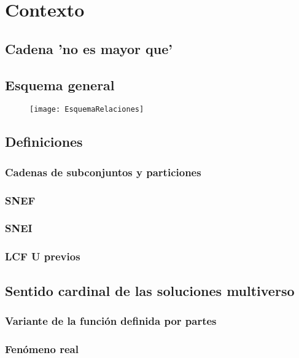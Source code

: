 \chapter{Contexto}

\section{Cadena 'no es mayor que'}

\newpage
\section{Esquema general}
	\begin{figure}[h!]
		\texttt{[image: EsquemaRelaciones]}
		\centering
	\end{figure}

\newpage
\section{Definiciones}
\subsection{Cadenas de subconjuntos y particiones}
\subsection{SNEF}
\subsection{SNEI}
\subsection{LCF U previos}



\newpage
\section{Sentido cardinal de las soluciones multiverso}

\subsection{Variante de la función definida por partes}
\subsection{Fenómeno real}

